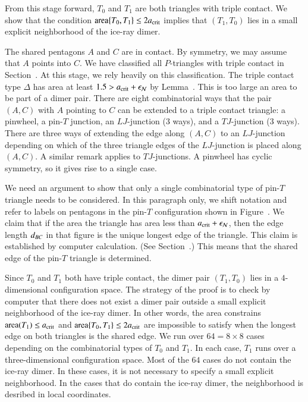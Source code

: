From this stage forward, $T_0$ and $T_1$ are both triangles with
triple contact.  We show that the condition ${\operatorname{area}}\{T_0,T_1\}\le
2a_\text{crit}$ implies that $(T_1,T_0)$ lies in a small explicit
neighborhood of the ice-ray dimer.

The shared pentagons $A$ and $C$ are in contact.  By symmetry, we may
assume that $A$ points into $C$.  We have classified all $P$-triangles
with triple contact in Section~.  At this stage, we
rely heavily on this classification.  The triple contact type $\Delta$
has area at least $1.5 > a_\text{crit}+\epsilon_{\mathcal N}$ by Lemma~.
This is too large an area to be part of a dimer pair.  There are eight
combinatorial ways that the pair $(A,C)$ with $A$ pointing to $C$ can
be extended to a triple contact triangle: a pinwheel, a pin-$T$
junction, an $LJ$-junction (3 ways), and a $TJ$-junction (3 ways).
There are three ways of extending the edge along $(A,C)$ to an
$LJ$-junction depending on which of the three triangle edges of the
$LJ$-junction is placed along $(A,C)$.  A similar remark applies to
$TJ$-junctions.  A pinwheel has cyclic symmetry, so it gives rise to a
single case.

We need an argument to show that only a single combinatorial type of
pin-$T$ triangle needs to be considered.  In this paragraph only, we
shift notation and refer to labels on pentagons in the pin-$T$
configuration shown in Figure~.  We claim that if
the area the triangle has area less than $a_\text{crit}+\epsilon_{\mathcal N}$, then the edge
length $d_{BC}$ in that figure is the unique longest edge of the
triangle.  This claim is established by computer
calculation.  (See Section~.)  This means
that the shared edge of the pin-$T$ triangle is determined.

Since $T_0$ and $T_1$ both have triple contact, the dimer pair
$(T_1,T_0)$ lies in a $4$-dimensional configuration space.  The
strategy of the proof is to check by computer that there does not
exist a dimer pair outside a small explicit neighborhood of the
ice-ray dimer.  In other words, the area constrains ${\operatorname{area}}(T_1)\le
a_\text{crit}$ and ${\operatorname{area}}\{T_0,T_1\}\le2a_\text{crit}$ are impossible to satisfy
when the longest edge on both triangles is the shared edge.  We run
over $64 = 8\times 8$ cases depending on the combinatorial types of
$T_0$ and $T_1$.  In each case, $T_1$ runs over a three-dimensional
configuration space.  Most of the $64$ cases do not contain the
ice-ray dimer.  In these cases, it is not necessary to specify a small
explicit neighborhood.  In the cases that do contain the ice-ray
dimer, the neighborhood is desribed in local coordinates.

